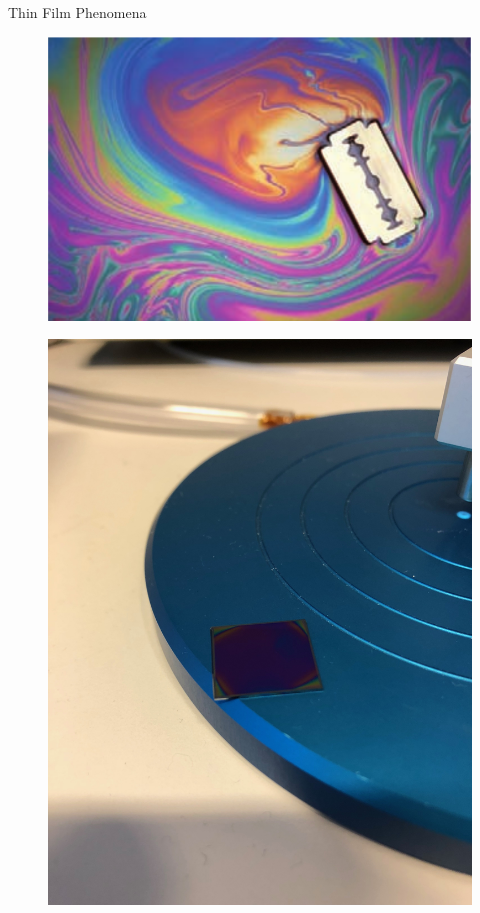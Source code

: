 \documentclass[10pt]{beamer}
\begin{document}
	\begin{frame}{Thin Film Phenomena}
				\begin{minipage}{0.47\textwidth}
				\begin{figure}
				\includegraphics[scale=0.25]{soap.png}
				\end{figure}
				\end{minipage}
				\begin{minipage}{0.5\textwidth}
				\begin{figure}
				\includegraphics[scale=0.05,angle=-90]{PSthinfilm.JPG}
				\end{figure}
				\end{minipage}	
	\end{frame}
	
\end{document}
